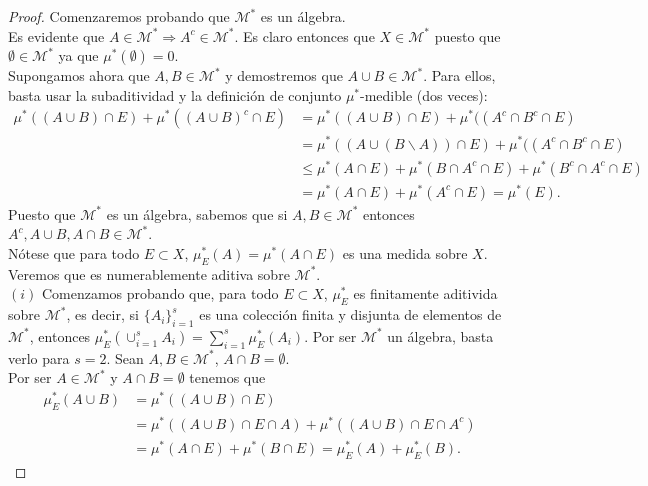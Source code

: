 \begin{proof}
Comenzaremos probando que $\mathcal{M}^*$ es un álgebra.
\\
\newline
Es evidente que $A \in \mathcal{M}^* \Longrightarrow A^c \in \mathcal{M}^*$. Es claro entonces que $X \in \mathcal{M}^*$ puesto que $\emptyset \in \mathcal{M}^*$ ya que $\mu^*(\emptyset) = 0$.
\\
\newline
Supongamos ahora que $A, B \in \mathcal{M}^*$ y demostremos que $A \cup B \in \mathcal{M}^*$. Para ellos, basta usar la subaditividad y la definición de conjunto $\mu^*$-medible (dos veces):
\begin{align*}
    \mu^*((A \cup B) \cap E) + \mu^*((A \cup B)^c \cap E ) &= \mu^*((A \cup B) \cap E) + \mu^*((A^c \cap B^c \cap E )\\
    &= \mu^*((A \cup (B \backslash A)) \cap E) + \mu^*((A^c \cap B^c \cap E )\\
    & \leq \mu^*(A \cap E) + \mu^*(B \cap A^c \cap E) + \mu^*(B^c \cap A^c \cap E)\\
    &= \mu^*(A \cap E) + \mu^*(A^c \cap E) = \mu^*(E).
\end{align*}
Puesto que $\mathcal{M}^*$ es un álgebra, sabemos que si $A, B \in \mathcal{M}^*$ entonces $A^c, A \cup B, A \cap B \in \mathcal{M}^*$.
\\
\newline
Nótese que para todo $E \subset X$, $\mu_E^*(A) = \mu^*(A \cap E)$ es una medida sobre $X$. Veremos que es numerablemente aditiva sobre $\mathcal{M}^*$.
\\
\newline
$(i)$ Comenzamos probando que, para todo $E \subset X$, $\mu_E^*$ es finitamente aditivida sobre $\mathcal{M}^*$, es decir, si $\{A_i\}_{i=1}^{s}$ es una colección finita y disjunta de elementos de $\mathcal{M}^*$, entonces $\mu_E^*(\cup_{i=1}^{s}{A_i}) = \sum_{i=1}^{s}{\mu_E^*(A_i)}$. Por ser $\mathcal{M}^*$ un álgebra, basta verlo para $s = 2$. Sean $A, B \in \mathcal{M}^*$, $A \cap B = \emptyset$.
\\
\newline
Por ser $A \in \mathcal{M}^*$ y $A \cap B = \emptyset$ tenemos que
\begin{align*}
    \mu_E^*(A \cup B) &= \mu^*((A \cup B) \cap E)\\
    &= \mu^*((A \cup B)\cap E \cap A) + \mu^*((A \cup B) \cap E \cap A^c)\\
    &= \mu^*(A \cap E) + \mu^*(B \cap E) = \mu_E^*(A) + \mu_E^*(B).

\end{align*}
\end{proof}
